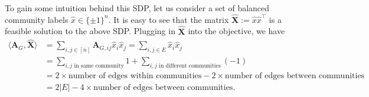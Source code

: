 \documentclass[11pt, titlepage]{article} %
\numberwithin{equation}{section}
\theoremstyle{definition}
\numberwithin{theorem}{section}
\numberwithin{lemma}{section}
\numberwithin{corollary}{section}
\numberwithin{proposition}{section}
\numberwithin{definition}{section}
\numberwithin{remark}{section}
\begin{document}
To gain some intuition behind this SDP, let us consider a set of balanced community labels 
$\hat{x} \in \{\pm 1\}^n$. It is easy to see that the matrix $\hat{\bm{X}} := \hat{x} \hat{x}^\top$ 
is a feasible solution to the above SDP. Plugging in $\hat{\bm{X}}$ into the objective, we have
\begin{align*}
\langle \bm{A}_G, \hat{\bm{X}} \rangle &= \sum_{i,j \in [n]} \bm{A}_{G,ij} \hat{x}_i \hat{x}_j
= \sum_{i,j \in E} \hat{x}_i \hat{x}_j\\
&= \sum_{i,j \text{ in same community}} 1 + \sum_{i,j \text{ in different communities}} (-1)\\
&= 2\times \text{number of edges within communities} - 2\times \text{number of edges between communities}\\
&= 2|E| - 4\times\text{number of edges between communities}.
\end{align*}
\end{document}
